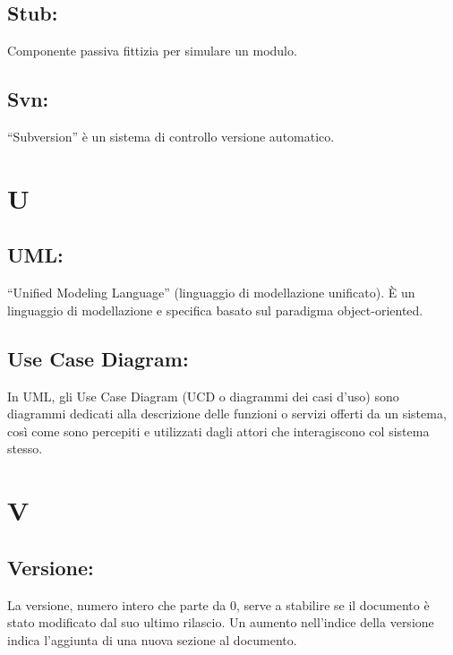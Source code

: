 \documentclass[11pt,titlepage,a4paper]{report}
\begin{document}
\section{Stub:}
Componente passiva fittizia per simulare un modulo.
\section{Svn:}
``Subversion'' \`e un sistema di controllo versione automatico. 

\chapter{U}
\section{UML:}
``Unified Modeling Language'' (linguaggio di modellazione unificato). \`E un linguaggio di modellazione e specifica basato sul paradigma object-oriented.
\section{Use Case Diagram:}
In UML, gli Use Case Diagram (UCD o diagrammi dei casi d'uso) sono diagrammi dedicati alla descrizione delle funzioni o servizi offerti da un sistema, cos\`i come sono percepiti e utilizzati dagli attori che interagiscono col sistema stesso. 

\chapter{V}
\section{Versione:}
La versione, numero intero che parte da 0, serve a stabilire se il documento \`e stato modificato dal suo ultimo rilascio. Un aumento nell'indice della versione indica l'aggiunta di una nuova sezione al documento.
\end{document}
